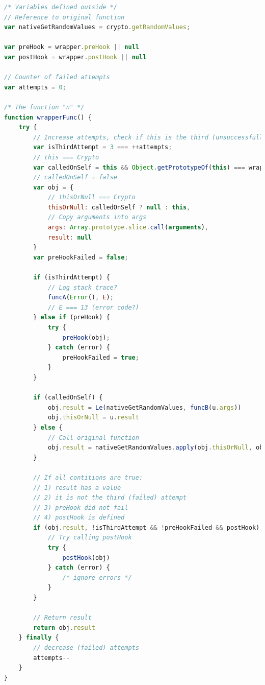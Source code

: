 \begin{lstlisting}[language=JavaScript,breaklines=true,breakatwhitespace=false,label={lst.reverseEngineeredFunc},caption={Attempt at reverse engineering the obfuscated function}]
/* Variables defined outside */
// Reference to original function
var nativeGetRandomValues = crypto.getRandomValues;

var preHook = wrapper.preHook || null
var postHook = wrapper.postHook || null

// Counter of failed attempts
var attempts = 0;

/* The function "n" */
function wrapperFunc() {
    try {
        // Increase attempts, check if this is the third (unsuccessfull) attempt
        var isThirdAttempt = 3 === ++attempts;
        // this === Crypto
        var calledOnSelf = this && Object.getPrototypeOf(this) === wrapper.prototype || false;
        // calledOnSelf = false
        var obj = {
            // thisOrNull === Crypto
            thisOrNull: calledOnSelf ? null : this,
            // Copy arguments into args
            args: Array.prototype.slice.call(arguments),
            result: null
        }
        var preHookFailed = false;

        if (isThirdAttempt) {
            // Log stack trace?
            funcA(Error(), E);
            // E === 13 (error code?)
        } else if (preHook) {
            try {
                preHook(obj);
            } catch (error) {
                preHookFailed = true;
            }
        }

        if (calledOnSelf) {
            obj.result = Le(nativeGetRandomValues, funcB(u.args))
            obj.thisOrNull = u.result
        } else {
            // Call original function
            obj.result = nativeGetRandomValues.apply(obj.thisOrNull, obj.args);
        }

        // If all contitions are true:
        // 1) result has a value
        // 2) it is not the third (failed) attempt
        // 3) preHook did not fail
        // 4) postHook is defined
        if (obj.result, !isThirdAttempt && !preHookFailed && postHook) {
            // Try calling postHook
            try {
                postHook(obj)
            } catch (error) {
                /* ignore errors */
            }
        }

        // Return result
        return obj.result
    } finally {
        // decrease (failed) attempts
        attempts--
    }
}
\end{lstlisting}
